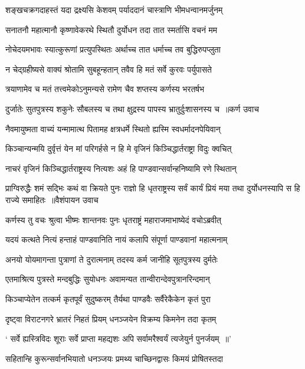 \twolineshloka
{शङ्खचक्रगदाहस्तं यदा द्रक्ष्यसि केशवम्}
{पर्याददानं चास्त्राणि भीमधन्वानमर्जुनम्}


\twolineshloka
{सनातनौ महात्मानौ कृष्णावेकरथे स्थितौ}
{दुर्योधन तदा तात स्मर्तासि वचनं मम}


\twolineshloka
{नोचेदयमभावः स्यात्कुरूणां प्रत्युपस्थितः}
{अर्थाच्च तात धर्माच्च तव बुद्धिरुपप्लुता}


\twolineshloka
{न चेद्ग्रहीष्यसे वाक्यं श्रोतामि सुबहून्हतान्}
{तवैव हि मतं सर्वे कुरवः पर्युपासते}


\twolineshloka
{त्रयाणामेव च मतं तत्त्वमेकोऽनुमन्यसे}
{रामेण चैव शप्तस्य कर्णस्य भरतर्षभ}


\threelineshloka
{दुर्जातेः सुतपुत्रस्य शकुनेः सौबलस्य च}
{तथा क्षुद्रस्य पापस्य भ्रातुर्दुःशासनस्य च ॥कर्ण उवाच}
{}


\twolineshloka
{नैवमायुष्मता वाच्यं यन्मामात्थ पितामह}
{क्षत्रधर्मे स्थितो ह्यस्मि स्वधर्मादनपेयिवान्}


\twolineshloka
{किञ्चान्यन्मयि दुर्वृत्तं येन मां परिगर्हसे}
{न हि मे वृजिनं किञ्चिद्धार्तराष्ट्रा विदुः क्वचित्}


\twolineshloka
{नाचरं वृजिनं किञ्चिद्धार्तराष्ट्रस्य नित्यशः}
{अहं हि पाण्डवान्सर्वान्हनिष्यामि रणे स्थितान्}


\fourlineindentedshloka
{प्राग्विरुद्धैः शमं सद्भिः कथं वा क्रियते पुनः}
{राज्ञो हि धृतराष्ट्रस्य सर्वं कार्यं प्रियं मया}
{तथा दुर्योधनस्यापि स हि राज्ये समाहितः ॥वैशंपायन उवाच}
{}


\twolineshloka
{कर्णस्य तु वचः श्रुत्वा भीष्मः शान्तनवः पुनः}
{धृतराष्ट्रं महाराजमाभाष्येदं वचोऽब्रवीत्}


\twolineshloka
{यदयं कत्थते नित्यं हन्ताहं पाण्डवानिति}
{नायं कलापि संपूर्णा पाण्डवानां महात्मनाम्}


\twolineshloka
{अनयो योयमागन्ता पुत्राणां ते दुरात्मनाम्}
{तदस्य कर्म जानीहि सूतपुत्रस्य दुर्मतेः}


\twolineshloka
{एतमाश्रित्य पुत्रस्ते मन्दबुद्धिः सुयोधनः}
{अवामन्यत तान्वीरान्देवपुत्रानरिन्दमान्}


\twolineshloka
{किञ्चाप्येतेन तत्कर्म कृतपूर्वं सुदुष्करम्}
{तैर्यथा पाण्डवैः सर्वैरेकैकेन कृतं पुरा}


\twolineshloka
{दृष्ट्वा विराटनगरे भ्रातरं निहतं प्रियम्}
{धनञ्जयेन विक्रम्य किमनेन तदा कृतम्}


\twolineshloka
{` सर्वे ह्यस्त्रिविदः शूराः सर्वे प्राप्ता महद्यशः}
{अपि सर्वामरैश्वर्यं त्यजेयुर्न पुनर्जयम् ॥'}


\twolineshloka
{सहितान्हि कुरून्सर्वानभियातो धनञ्जयः}
{प्रमथ्य चाच्छिनद्वासः किमयं प्रोषितस्तदा}


